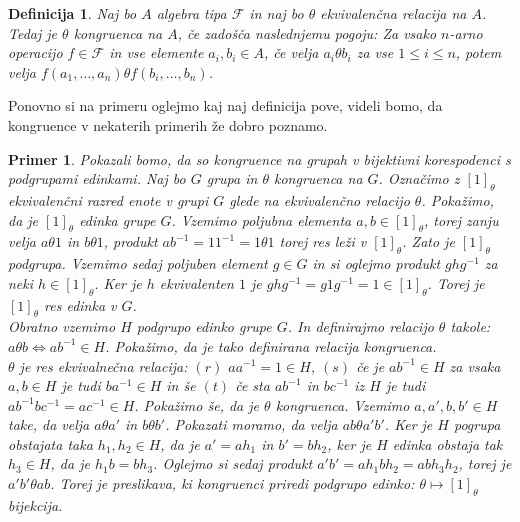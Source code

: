\documentclass[a4paper,11pt]{article}
\newtheorem{definicija}{Definicija}
\newtheorem{primer}{Primer}
\begin{document}
\begin{definicija}
    Naj bo $A$ algebra tipa $\mathcal{F}$ in naj bo $\theta$ ekvivalenčna relacija na $A$. Tedaj je $\theta$ 
    \emph{kongruenca} na $A$, če zadošča naslednjemu pogoju: Za vsako $n$-arno operacijo $f \in \mathcal{F}$ in 
    vse elemente $a_i, b_i \in A$, če velja $a_i \theta b_i$ za vse $1 \leq i \leq n$, potem velja $f \left(a_1, \dots, 
    a_n\right) \theta f\left(b_i, \dots, b_n\right)$.
\end{definicija}

Ponovno si na primeru oglejmo kaj naj definicija pove, videli bomo, da kongruence v nekaterih primerih že dobro poznamo.

\begin{primer}
 Pokazali bomo, da so kongruence na grupah v bijektivni korespodenci s podgrupami edinkami. 
 Naj bo $G$ grupa in $\theta$ kongruenca na $G$. Označimo z $\left[1\right]_{\theta}$ ekvivalenčni razred enote v grupi 
 $G$ glede na ekvivalenčno relacijo $\theta$. Pokažimo, da je $\left[1\right]_{\theta}$ edinka grupe $G$. Vzemimo 
 poljubna elementa $a, b \in \left[1\right]_{\theta}$, torej zanju velja $a \theta 1$ in $b \theta 1$, produkt 
 $a b^{-1} = 1 1^{-1} = 1 \theta 1$ torej res leži v $\left[1\right]_{\theta}$. Zato je $\left[1\right]_{\theta}$ 
 podgrupa. Vzemimo sedaj poljuben element $g \in G$ in si oglejmo produkt $g h g^{-1}$ za neki $h \in 
 \left[1\right]_{\theta}$. Ker je $h$ ekvivalenten $1$ je $g h g^{-1} = g 1 g^{-1} = 1 \in \left[1\right]_{\theta}$. 
 Torej je $\left[1\right]_{\theta}$ res edinka v $G$.\\
 Obratno vzemimo $H$ podgrupo edinko grupe $G$. In definirajmo relacijo $\theta$ takole: $a \theta b \Leftrightarrow 
 a b^{-1} \in H$. Pokažimo, da je tako definirana relacija kongruenca.\\ 
 $\theta$ je res ekvivalnečna relacija: $(r)$ $aa^{-1}=
 1 \in H$, $(s)$ če je $ab^{-1} \in H$ za vsaka $a, b \in H$ je tudi $ba^{-1} \in H$ in še $(t)$ če sta $ab^{-1}$ in
 $bc^{-1}$ iz $H$ je tudi $ab^{-1} b c^{-1}= a c^{-1} \in H$. Pokažimo še, da je $\theta$ kongruenca. Vzemimo $a, a', 
 b, b'\in H$ take, da velja $a \theta a'$ in $b \theta b'$. Pokazati moramo, da velja $ab \theta a'b'$. Ker je $H$ 
 pogrupa obstajata taka $h_1, h_2 \in H$, da je $a' = ah_1$ in $b' = b h_2$, ker je $H$ edinka obstaja tak $h_3 \in H$, 
 da je $h_1b = bh_3$. Oglejmo si sedaj produkt $a'b' = ah_1bh_2 = abh_3h_2$, torej je $a'b' \theta ab$. 
 Torej je preslikava, ki kongruenci priredi podgrupo edinko: $\theta \mapsto \left[1\right]_{\theta}$ bijekcija.

\end{primer}
\end{document}
